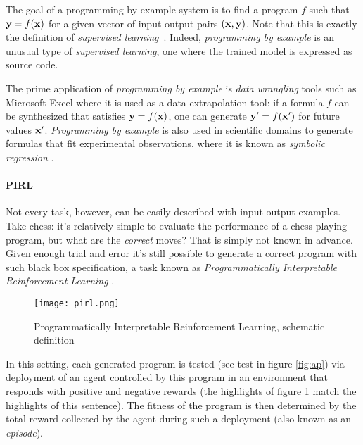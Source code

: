 The goal of a programming by example system is to find a program $f$ such that $\mathbf{y}=f(\mathbf{x})$ for a given vector of input-output pairs $(\mathbf{x},\mathbf{y})$. 
Note that this is exactly the definition of \emph{supervised learning}~\cite{cunninghamSupervisedLearning2008}.
Indeed, \emph{programming by example} is an unusual type of \emph{supervised learning}, one where the trained model is expressed as source code.

The prime application of \emph{programming by example} is \emph{data wrangling} tools such as Microsoft Excel \cite{gulwani2016:programming} where it is used as a data extrapolation tool: if a formula $f$ can be synthesized that satisfies $\mathbf{y}=f(\mathbf{x})$, one can generate $\mathbf{y} '=f(\mathbf{x} ')$ for future values $\mathbf{x} '$.
\emph{Programming by example} is also used in scientific domains to generate formulas that fit experimental observations, where it is known as \emph{symbolic regression} \cite{makkeInterpretableScientificDiscovery2022}.

\paragraph{PIRL}

Not every task, however, can be easily described with input-output examples. 
Take chess: it's relatively simple to evaluate the performance of a chess-playing program, but what are the \emph{correct} moves? 
That is simply not known in advance.
Given enough trial and error it's still possible to generate a correct program with such black box specification, a task known as \emph{Programmatically Interpretable Reinforcement Learning} \cite{pirl}.

\begin{figure}
    \centering
    \texttt{[image: pirl.png]}
    \caption{Programmatically Interpretable Reinforcement Learning, schematic definition}
    \label{fig:pirl}
\end{figure}

In this setting, each generated program is tested (see \textcolor{accent}{test} in figure \ref{fig:ap}) via deployment of an \textcolor{accent}{agent} controlled by this program in an environment that responds with positive and negative \textcolor{accent}{rewards} (the highlights of figure \ref{fig:pirl} match the highlights of this sentence).
The fitness of the program is then determined by the total reward collected by the agent during such a deployment (also known as an \emph{episode}).

